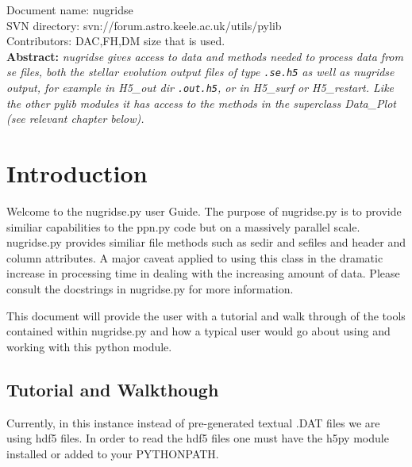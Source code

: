 \renewcommand{\ndoctitle}{nugridse.py: The python workhorse to get, plot and analyse se files} 
\renewcommand{\ndocname}{nugridse}                      
\renewcommand{\svndir}{svn://forum.astro.keele.ac.uk/utils/pylib}  
\renewcommand{\ndoccontribs}{DAC,FH,DM size that is used.}



Document name: \ndocname \\
SVN directory: \svndir\\
Contributors: \ndoccontribs\\



{  \textbf{Abstract:} \slshape
nugridse gives access to data and methods needed to process data from se files, both the stellar evolution output files of type \texttt{.se.h5} as well as nugridse output, for example in H5\_out dir \texttt{.out.h5}, or in H5\_surf or H5\_restart. Like the other pylib modules it has access to the methods in the superclass Data\_Plot (see relevant chapter below). 
}

\section{Introduction}
Welcome to the nugridse.py user Guide. The purpose of nugridse.py is to provide similiar capabilities to the ppn.py code but on a massively parallel scale. nugridse.py provides similiar file methods such as sedir and sefiles and header and column attributes. 
A major caveat applied to using this class in the dramatic increase in processing time in dealing with  the increasing amount of data.
Please consult the docstrings in nugridse.py for more information.

This document will provide the user with a 
tutorial and walk through of the tools contained within nugridse.py and
how a typical user would go about using and working with this python module.
\subsection{Tutorial and Walkthough}

Currently,  
in this instance instead of pre-generated textual .DAT files we are using hdf5 files.  
In order to read the hdf5 files one must have the h5py module installed or added to your PYTHONPATH.
\newline

